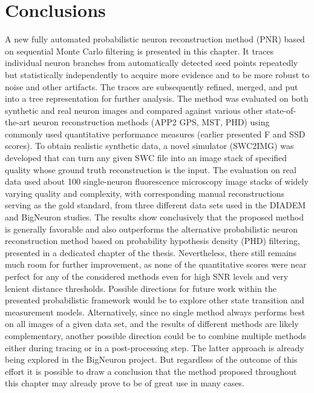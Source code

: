 \section{Conclusions} 
\label{sec:conclusions}
A new fully automated probabilistic neuron reconstruction method (PNR) based on sequential Monte Carlo filtering is presented in this chapter. It traces individual neuron branches from automatically detected seed points repeatedly but statistically independently to acquire more evidence and to be more robust to noise and other artifacts. The traces are subsequently refined, merged, and put into a tree representation for further analysis. The method was evaluated on both synthetic and real neuron images and compared against various other state-of-the-art neuron reconstruction methods (APP2 GPS, MST, PHD) using commonly used quantitative performance measures (earlier presented F and SSD scores). To obtain realistic synthetic data, a novel simulator (SWC2IMG) was developed that can turn any given SWC file into an image stack of specified quality whose ground truth reconstruction is the input. The evaluation on real data used about 100 single-neuron fluorescence microscopy image stacks of widely varying quality and complexity, with corresponding manual reconstructions serving as the gold standard, from three different data sets used in the DIADEM and BigNeuron studies. The results show conclusively that the proposed method is generally favorable and also outperforms the alternative probabilistic neuron reconstruction method based on probability hypothesis density (PHD) filtering, presented in a dedicated chapter of the thesis. Nevertheless, there still remains much room for further improvement, as none of the quantitative scores were near perfect for any of the considered methods even for high SNR levels and very lenient distance thresholds. Possible directions for future work within the presented probabilistic framework would be to explore other state transition and measurement models. Alternatively, since no single method always performs best on all images of a given data set, and the results of different methods are likely complementary, another possible direction could be to combine multiple methods either during tracing or in a post-processing step. The latter approach is already being explored in the BigNeuron project. But regardless of the outcome of this effort it is possible to draw a conclusion that the method proposed throughout this chapter may already prove to be of great use in many cases.